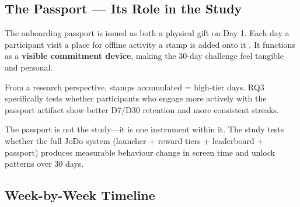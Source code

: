 \documentclass[12pt, a4paper]{article}
\begin{document}
\subsection{The Passport --- Its Role in the Study}

The onboarding passport is issued as both a physical gift on Day 1. Each day a participant visit a place for offline activity a stamp is added onto it . It functions as a \textbf{visible commitment device}, making the 30-day challenge feel tangible and personal.

From a research perspective, stamps accumulated = high-tier days. RQ3 specifically tests whether participants who engage more actively with the passport artifact show better D7/D30 retention and more consistent streaks.

\begin{notebox}
\small The passport is not the study---it is one instrument within it. The study tests whether the full JoDo system (launcher + reward tiers + leaderboard + passport) produces measurable behaviour change in screen time and unlock patterns over 30 days.
\end{notebox}

\subsection{Week-by-Week Timeline}
\end{document}

